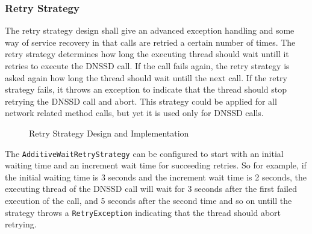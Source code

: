 \subsubsection{Retry Strategy}
The retry strategy design shall give an advanced exception handling and some way of service recovery in that calls are retried a certain number of times. The retry strategy determines how long the executing thread should wait untill it retries to execute the DNSSD call. If the call fails again, the retry strategy is asked again how long the thread should wait untill the next call. If the retry strategy fails, it throws an exception to indicate that the thread should stop retrying the DNSSD call and abort. This strategy could be applied for all network related method calls, but yet it is used only for DNSSD calls. 

\begin{figure}[H]
 \centering
 \caption{Retry Strategy Design and Implementation}
 \label{fig:network.discovery.retrystrategy}
\end{figure}

The \texttt{AdditiveWaitRetryStrategy} can be configured to start with an initial waiting time and an increment wait time for succeeding retries. So for example, if the initial waiting time is 3 seconds and the increment wait time is 2 seconds, the executing thread of the DNSSD call will wait for 3 seconds after the first failed execution of the call, and 5 seconds after the second time and so on untill the strategy throws a \texttt{RetryException} indicating that the thread should abort retrying.

